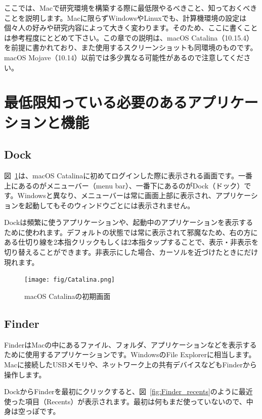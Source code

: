 ここでは、Macで研究環境を構築する際に最低限やるべきこと、知っておくべきことを説明します。Macに限らずWindowsやLinuxでも、計算機環境の設定は個々人の好みや研究内容によって大きく変わります。そのため、ここに書くことは参考程度にとどめて下さい。この章での説明は、macOS Catalina（10.15.4）を前提に書かれており、また使用するスクリーンショットも同環境のものです。macOS Mojave（10.14）以前では多少異なる可能性があるので注意してください。

\section{最低限知っている必要のあるアプリケーションと機能}

\subsection{Dock}
図~\ref{fig:Catalina}は、macOS Catalinaに初めてログインした際に表示される画面です。一番上にあるのがメニューバー（menu bar）、一番下にあるのがDock（ドック）です。Windowsと異なり、メニューバーは常に画面上部に表示され、アプリケーションを起動してもそのウィンドウごとには表示されません。

Dockは頻繁に使うアプリケーションや、起動中のアプリケーションを表示するために使われます。デフォルトの状態では常に表示されて邪魔なため、右の方にある仕切り線を2本指クリックもしくは2本指タップすることで、表示・非表示を切り替えることができます。非表示にした場合、カーソルを近づけたときにだけ現れます。
\begin{figure}
  \centering
  \texttt{[image: fig/Catalina.png]}
  \caption{macOS Catalinaの初期画面}
  \label{fig:Catalina}
\end{figure}

\subsection{Finder}
\label{subsec:Finder}
FinderはMacの中にあるファイル、フォルダ、アプリケーションなどを表示するために使用するアプリケーションです。WindowsのFile Explorerに相当します。Macに接続したUSBメモリや、ネットワーク上の共有デバイスなどもFinderから操作します。

DockからFinderを最初にクリックすると、図~\ref{fig:Finder_recents}のように最近使った項目（Recents）が表示されます。最初は何もまだ使っていないので、中身は空っぽです。

